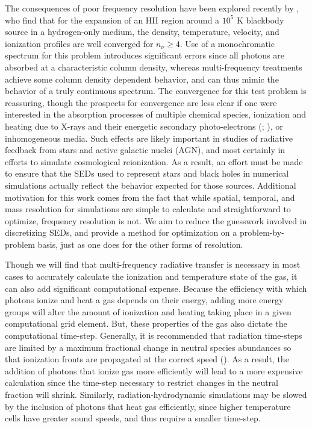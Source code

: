 \documentclass[preprint2]{aastex}              %
\begin{document}
The consequences of poor frequency resolution have been explored recently by \cite{Wise2011}, who find that for the expansion of an HII region around a $10^5$ K blackbody source in a hydrogen-only medium, the density, temperature, velocity, and ionization profiles are well converged for $n_{\nu} \ge 4$.  Use of a monochromatic spectrum for this problem introduces significant errors since all photons are absorbed at a characteristic column density, whereas multi-frequency treatments achieve some column density dependent behavior, and can thus mimic the behavior of a truly continuous spectrum.  The convergence for this test problem is reassuring, though the prospects for convergence are less clear if one were interested in the absorption processes of multiple chemical species, ionization and heating due to X-rays and their energetic secondary photo-electrons (\cite{Shull1985}; \cite{Furlanetto2010}), or inhomogeneous media.  Such effects are likely important in studies of radiative feedback from stars and active galactic nuclei (AGN), and most certainly in efforts to simulate cosmological reionization.  As a result, an effort must be made to ensure that the SEDs used to represent stars and black holes in numerical simulations actually reflect the behavior expected for those sources.  Additional motivation for this work comes from the fact that while spatial, temporal, and mass resolution for simulations are simple to calculate and straightforward to optimize, frequency resolution is not.  We aim to reduce the guesswork involved in discretizing SEDs, and provide a method for optimization on a problem-by-problem basis, just as one does for the other forms of resolution.

Though we will find that multi-frequency radiative transfer is necessary in most cases to accurately calculate the ionization and temperature state of the gas, it can also add significant computational expense.  Because the efficiency with which photons ionize and heat a gas depends on their energy, adding more energy groups will alter the amount of ionization and heating taking place in a given computational grid element.  But, these properties of the gas also dictate the computational time-step.  Generally, it is recommended that radiation time-steps are limited by a maximum fractional change in neutral species abundances so that ionization fronts are propagated at the correct speed (\cite{Shapiro2004}).  As a result, the addition of photons that ionize gas more efficiently will lead to a more expensive calculation since the time-step necessary to restrict changes in the neutral fraction will shrink.  Similarly, radiation-hydrodynamic simulations may be slowed by the inclusion of photons that heat gas efficiently, since higher temperature cells have greater sound speeds, and thus require a smaller time-step.  
\end{document}
